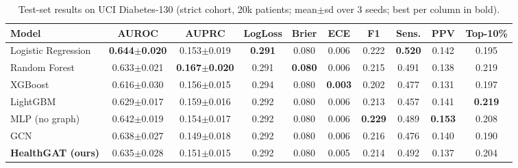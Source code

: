 \begin{table}[t]\centering\caption{Test-set results on UCI Diabetes-130 (strict cohort, 20k patients; mean$\pm$sd over 3 seeds; best per column in bold).}\label{tab:main}
\begin{tabular}{lccccccccc}\toprule
Model & AUROC & AUPRC & LogLoss & Brier & ECE & F1 & Sens. & PPV & Top-10\% \\\midrule
Logistic Regression & \textbf{0.644$\pm$0.020} & 0.153$\pm$0.019 & \textbf{0.291} & 0.080 & 0.006 & 0.222 & \textbf{0.520} & 0.142 & 0.195 \\
Random Forest & 0.633$\pm$0.021 & \textbf{0.167$\pm$0.020} & 0.291 & \textbf{0.080} & 0.006 & 0.215 & 0.491 & 0.138 & 0.219 \\
XGBoost & 0.616$\pm$0.030 & 0.156$\pm$0.015 & 0.294 & 0.080 & \textbf{0.003} & 0.202 & 0.477 & 0.131 & 0.197 \\
LightGBM & 0.629$\pm$0.017 & 0.159$\pm$0.016 & 0.292 & 0.080 & 0.006 & 0.213 & 0.457 & 0.141 & \textbf{0.219} \\
\midrule
MLP (no graph) & 0.642$\pm$0.019 & 0.154$\pm$0.017 & 0.292 & 0.080 & 0.006 & \textbf{0.229} & 0.489 & \textbf{0.153} & 0.208 \\
GCN & 0.638$\pm$0.027 & 0.149$\pm$0.018 & 0.292 & 0.080 & 0.006 & 0.216 & 0.476 & 0.140 & 0.190 \\
\textbf{HealthGAT (ours)} & 0.635$\pm$0.028 & 0.151$\pm$0.015 & 0.292 & 0.080 & 0.005 & 0.214 & 0.492 & 0.137 & 0.204 \\
\bottomrule\end{tabular}\end{table}
